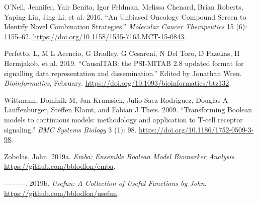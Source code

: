 \documentclass[
  12pt,
]{book}
\begin{document}
\leavevmode\hypertarget{ref-ONeil2016}{}%
O'Neil, Jennifer, Yair Benita, Igor Feldman, Melissa Chenard, Brian Roberts, Yaping Liu, Jing Li, et al. 2016. ``An Unbiased Oncology Compound Screen to Identify Novel Combination Strategies.'' \emph{Molecular Cancer Therapeutics} 15 (6): 1155--62. \url{https://doi.org/10.1158/1535-7163.MCT-15-0843}.

\leavevmode\hypertarget{ref-Perfetto2019}{}%
Perfetto, L, M L Acencio, G Bradley, G Cesareni, N Del Toro, D Fazekas, H Hermjakob, et al. 2019. ``CausalTAB: the PSI-MITAB 2.8 updated format for signalling data representation and dissemination.'' Edited by Jonathan Wren. \emph{Bioinformatics}, February. \url{https://doi.org/10.1093/bioinformatics/btz132}.

\leavevmode\hypertarget{ref-Wittmann2009}{}%
Wittmann, Dominik M, Jan Krumsiek, Julio Saez-Rodriguez, Douglas A Lauffenburger, Steffen Klamt, and Fabian J Theis. 2009. ``Transforming Boolean models to continuous models: methodology and application to T-cell receptor signaling.'' \emph{BMC Systems Biology} 3 (1): 98. \url{https://doi.org/10.1186/1752-0509-3-98}.

\leavevmode\hypertarget{ref-R-emba}{}%
Zobolas, John. 2019a. \emph{Emba: Ensemble Boolean Model Biomarker Analysis}. \url{https://github.com/bblodfon/emba}.

\leavevmode\hypertarget{ref-R-usefun}{}%
---------. 2019b. \emph{Usefun: A Collection of Useful Functions by John}. \url{https://github.com/bblodfon/usefun}.
\end{document}
